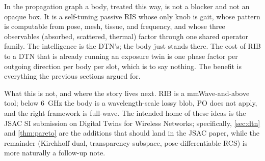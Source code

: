 \documentclass[11pt,a4paper]{article}
\theoremstyle{definition}
\begin{document}
In the propagation graph a body, treated this way, is not a blocker
and not an opaque box.  It is a self-tuning passive RIS whose only
knob is gait, whose pattern is computable from pose, mesh, tissue,
and frequency, and whose three observables (absorbed, scattered,
thermal) factor through one shared operator family.  The
intelligence is the DTN's; the body just stands there.  The cost of
RIB to a DTN that is already running an exposure twin is one phase
factor per outgoing direction per body per slot, which is to say
nothing.  The benefit is everything the previous sections argued for.

What this is not, and where the story lives next.  RIB is a
mmWave-and-above tool; below \SI{6}{GHz} the body is a wavelength-scale
lossy blob, PO does not apply, and the right framework is full-wave.
The intended home of these ideas is the JSAC SI submission on
Digital Twins for Wireless Networks; specifically, \cref{sec:dtn} and
\cref{thm:pareto} are the additions that should land in the JSAC
paper, while the remainder (Kirchhoff dual, transparency subspace,
pose-differentiable RCS) is more naturally a follow-up note.
\end{document}
